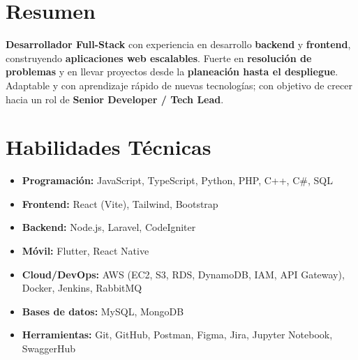 \section{Resumen}
\textbf{Desarrollador Full-Stack} con experiencia en desarrollo \textbf{backend} y \textbf{frontend}, construyendo \textbf{aplicaciones web escalables}. Fuerte en \textbf{resoluci\'on de problemas} y en llevar proyectos desde la \textbf{planeaci\'on hasta el despliegue}. Adaptable y con aprendizaje r\'apido de nuevas tecnolog\'ias; con objetivo de crecer hacia un rol de \textbf{Senior Developer / Tech Lead}.

\section{Habilidades T\'ecnicas}
\begin{itemize}
    \item \textbf{Programaci\'on:} JavaScript, TypeScript, Python, PHP, C++, C\#, SQL
    \item \textbf{Frontend:} React (Vite), Tailwind, Bootstrap
    \item \textbf{Backend:} Node.js, Laravel, CodeIgniter
    \item \textbf{M\'ovil:} Flutter, React Native
    \item \textbf{Cloud/DevOps:} AWS (EC2, S3, RDS, DynamoDB, IAM, API Gateway), Docker, Jenkins, RabbitMQ
    \item \textbf{Bases de datos:} MySQL, MongoDB
    \item \textbf{Herramientas:} Git, GitHub, Postman, Figma, Jira, Jupyter Notebook, SwaggerHub
\end{itemize}


